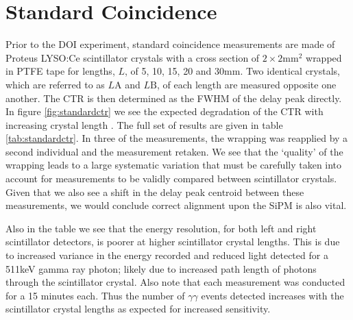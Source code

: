 \section{Standard Coincidence}
\label{sec:standardctr}
Prior to the DOI experiment, standard coincidence measurements are made of Proteus LYSO:Ce scintillator crystals with a cross section of $2\times2$mm$^2$ wrapped in PTFE tape for lengths, $L$, of 5, 10, 15, 20 and 30mm. Two identical crystals, which are referred to as $L\text{A}$ and $L\text{B}$, of each length are measured opposite one another. The CTR is then determined as the FWHM of the delay peak directly. In figure \ref{fig:standardctr} we see the expected degradation of the CTR with increasing crystal length \cite{r_Paganoni_Pauwels_et_al__2011}\cite{Wiener_Kaul_Surti_Karp_2010}\cite{Choong_2009}\cite{Gola_Piemonte_Tarolli_2013}\cite{o_Pro_Serra_Tarolli_Zorzi_2011}. The full set of results are given in table \ref{tab:standardctr}. In three of the measurements, the wrapping was reapplied by a second individual and the measurement retaken. We see that the `quality' of the wrapping leads to a large systematic variation that must be carefully taken into account for measurements to be validly compared between scintillator crystals. Given that we also see a shift in the delay peak centroid between these measurements, we would conclude correct alignment upon the SiPM is also vital.

Also in the table we see that the energy resolution, for both left and right scintillator detectors, is poorer at higher scintillator crystal lengths. This is due to increased variance in the energy recorded and reduced light detected for a 511keV gamma ray photon; likely due to increased path length of photons through the scintillator crystal. Also note that each measurement was conducted for a 15 minutes each. Thus the number of $\gamma\gamma$ events detected increases with the scintillator crystal lengths as expected for increased sensitivity.